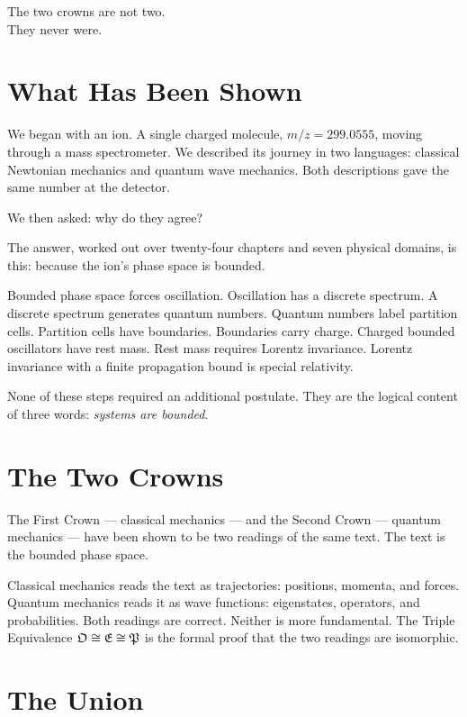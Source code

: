 
\epigraph{%
  The two crowns are not two.\\
  They never were.%
}{}

\section{What Has Been Shown}
\label{sec:ch26-what}

We began with an ion.
A single charged molecule, $m/z = 299.0555$, moving through a mass spectrometer.
We described its journey in two languages: classical Newtonian mechanics and
quantum wave mechanics.
Both descriptions gave the same number at the detector.

We then asked: why do they agree?

The answer, worked out over twenty-four chapters and seven physical domains,
is this: because the ion's phase space is bounded.

Bounded phase space forces oscillation.
Oscillation has a discrete spectrum.
A discrete spectrum generates quantum numbers.
Quantum numbers label partition cells.
Partition cells have boundaries.
Boundaries carry charge.
Charged bounded oscillators have rest mass.
Rest mass requires Lorentz invariance.
Lorentz invariance with a finite propagation bound is special relativity.

None of these steps required an additional postulate.
They are the logical content of three words: \emph{systems are bounded}.

\section{The Two Crowns}
\label{sec:ch26-crowns}

The First Crown --- classical mechanics --- and the Second Crown ---
quantum mechanics --- have been shown to be two readings of the same text.
The text is the bounded phase space.

Classical mechanics reads the text as trajectories: positions, momenta, and
forces.
Quantum mechanics reads it as wave functions: eigenstates, operators, and
probabilities.
Both readings are correct.
Neither is more fundamental.
The Triple Equivalence $\mathfrak{O} \cong \mathfrak{E} \cong \mathfrak{P}$ is the formal proof
that the two readings are isomorphic.

\section{The Union}
\label{sec:ch26-theunion}


